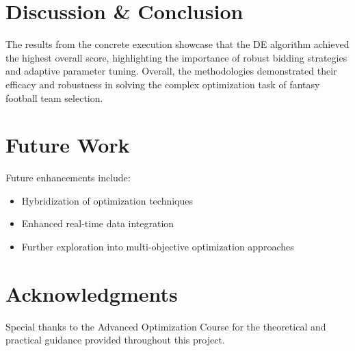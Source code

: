\documentclass[sigconf]{acmart}
\begin{document}
	\section{Discussion \& Conclusion}
	The results from the concrete execution showcase that the DE algorithm achieved the highest overall score, highlighting the importance of robust bidding strategies and adaptive parameter tuning. Overall, the methodologies demonstrated their efficacy and robustness in solving the complex optimization task of fantasy football team selection.
	
	\section{Future Work}
	Future enhancements include:
	\begin{itemize}
		\item Hybridization of optimization techniques
		\item Enhanced real-time data integration
		\item Further exploration into multi-objective optimization approaches
	\end{itemize}
	
	\section*{Acknowledgments}
	Special thanks to the Advanced Optimization Course for the theoretical and practical guidance provided throughout this project.
	
	
	
	
\end{document}

